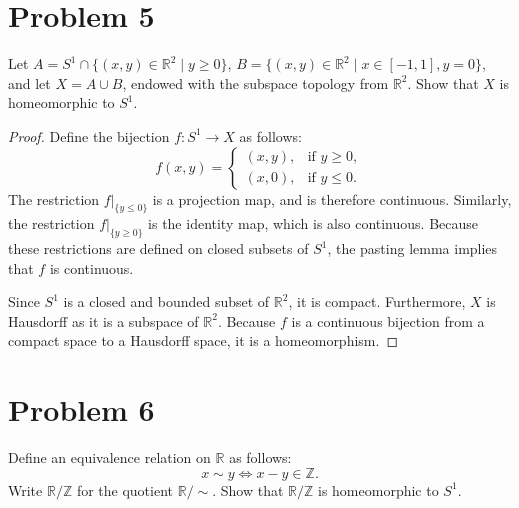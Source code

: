 \documentclass[a4paper,11pt]{article}
\newcommand{\Z}{\mathbb{Z}}
\newcommand{\R}{\mathbb{R}}
\begin{document}
\section*{Problem 5}
Let $A = S^1 \cap \{(x, y) \in \R^2 \mid y \geq 0\}$, $B = \{(x, y) \in \R^2 \mid x \in [-1, 1], y = 0\}$, and let $X = A \cup B$, endowed with the subspace topology from $\R^2$. Show that $X$ is homeomorphic to $S^1$.

\begin{proof}
    Define the bijection $f\colon S^1 \to X$ as follows:
    \begin{equation*}
        f(x,y) = 
        \begin{cases} 
            (x,y), & \text{if } y \geq 0, \\
            (x,0), & \text{if } y \leq 0. 
        \end{cases}
    \end{equation*}
    The restriction $f|_{\{y \leq 0\}}$ is a projection map, and is therefore continuous. Similarly, the restriction $f|_{\{y \geq 0\}}$ is the identity map, which is also continuous. Because these restrictions are defined on closed subsets of $S^1$, the pasting lemma implies that $f$ is continuous.
    
    Since $S^1$ is a closed and bounded subset of $\R^2$, it is compact. Furthermore, $X$ is Hausdorff as it is a subspace of $\R^2$. Because $f$ is a continuous bijection from a compact space to a Hausdorff space, it is a homeomorphism.
\end{proof}

\section*{Problem 6}
Define an equivalence relation on $\R$ as follows:
\[ x \sim y \iff x - y \in \Z. \]
Write $\R/\Z$ for the quotient $\R/{\sim}$. Show that $\R/\Z$ is homeomorphic to $S^1$.
\end{document}
